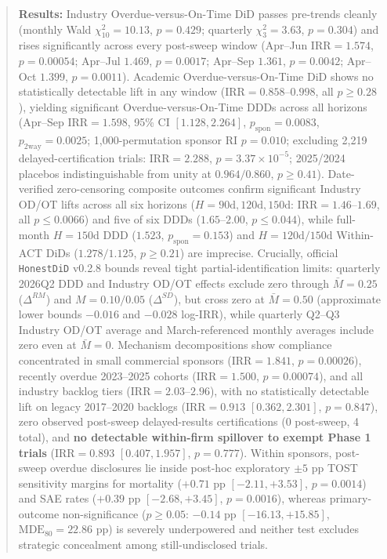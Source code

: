 \documentclass[11pt,letterpaper]{article}
\begin{document}
\begin{abstract}
\noindent\textbf{Results:} Industry Overdue-versus-On-Time DiD passes pre-trends cleanly (monthly Wald $\chi^2_{10}=10.13$, $p=0.429$; quarterly $\chi^2_3=3.63$, $p=0.304$) and rises significantly across every post-sweep window (Apr--Jun $\mathrm{IRR}=1.574$, $p=0.00054$; Apr--Jul $1.469$, $p=0.0017$; Apr--Sep $1.361$, $p=0.0042$; Apr--Oct $1.399$, $p=0.0011$). Academic Overdue-versus-On-Time DiD shows no statistically detectable lift in any window ($\mathrm{IRR}=0.858$--$0.998$, all $p\ge 0.28$), yielding significant Overdue-versus-On-Time DDDs across all horizons (Apr--Sep $\mathrm{IRR}=1.598$, 95\% CI $[1.128, 2.264]$, $p_{\mathrm{spon}}=0.0083$, $p_{\mathrm{2way}}=0.0025$; 1,000-permutation sponsor RI $p=0.010$; excluding 2,219 delayed-certification trials: $\mathrm{IRR}=2.288$, $p=3.37\times 10^{-5}$; 2025/2024 placebos indistinguishable from unity at $0.964/0.860$, $p\ge 0.41$). Date-verified zero-censoring composite outcomes confirm significant Industry OD/OT lifts across all six horizons ($H=90\text{d},120\text{d},150\text{d}$: $\mathrm{IRR}=1.46$--$1.69$, all $p\le 0.0066$) and five of six DDDs ($1.65$--$2.00$, $p\le 0.044$), while full-month $H=150\text{d}$ DDD ($1.523$, $p_{\mathrm{spon}}=0.153$) and $H=120\text{d}/150\text{d}$ Within-ACT DiDs ($1.278/1.125$, $p\ge 0.21$) are imprecise. Crucially, official \texttt{HonestDiD} v0.2.8 bounds reveal tight partial-identification limits: quarterly 2026Q2 DDD and Industry OD/OT effects exclude zero through $\bar{M}=0.25$ ($\Delta^{RM}$) and $M=0.10/0.05$ ($\Delta^{SD}$), but cross zero at $\bar{M}=0.50$ (approximate lower bounds $-0.016$ and $-0.028$ log-IRR), while quarterly Q2--Q3 Industry OD/OT average and March-referenced monthly averages include zero even at $\bar{M}=0$. Mechanism decompositions show compliance concentrated in small commercial sponsors ($\mathrm{IRR}=1.841$, $p=0.00026$), recently overdue 2023--2025 cohorts ($\mathrm{IRR}=1.500$, $p=0.00074$), and all industry backlog tiers ($\mathrm{IRR}=2.03$--$2.96$), with no statistically detectable lift on legacy 2017--2020 backlogs ($\mathrm{IRR}=0.913$ $[0.362, 2.301]$, $p=0.847$), zero observed post-sweep delayed-results certifications (0 post-sweep, 4 total), and \textbf{no detectable within-firm spillover to exempt Phase 1 trials} ($\mathrm{IRR}=0.893$ $[0.407, 1.957]$, $p=0.777$). Within sponsors, post-sweep overdue disclosures lie inside post-hoc exploratory $\pm 5$ pp TOST sensitivity margins for mortality ($+0.71$ pp $[-2.11, +3.53]$, $p=0.0014$) and SAE rates ($+0.39$ pp $[-2.68, +3.45]$, $p=0.0016$), whereas primary-outcome non-significance ($p\ge 0.05$: $-0.14$ pp $[-16.13, +15.85]$, $\mathrm{MDE}_{80}=22.86$ pp) is severely underpowered and neither test excludes strategic concealment among still-undisclosed trials.


\end{abstract}
\end{document}
